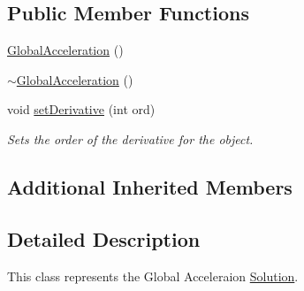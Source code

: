 \subsection*{Public Member Functions}
\begin{DoxyCompactItemize}
\item 
\hyperlink{class_global_acceleration_a37a05fcecd06641847388428a3f43fb8}{Global\-Acceleration} ()
\item 
\hyperlink{class_global_acceleration_aafb7853a1923f0e06b96f2ef4eca03d3}{$\sim$\-Global\-Acceleration} ()
\item 
void \hyperlink{class_global_acceleration_a14a041ea42d4c1bc10211c9a44aa3431}{set\-Derivative} (int ord)
\begin{DoxyCompactList}\small\item\em Sets the order of the derivative for the object. \end{DoxyCompactList}\end{DoxyCompactItemize}
\subsection*{Additional Inherited Members}


\subsection{Detailed Description}
This class represents the Global Acceleraion \hyperlink{class_solution}{Solution}. 

